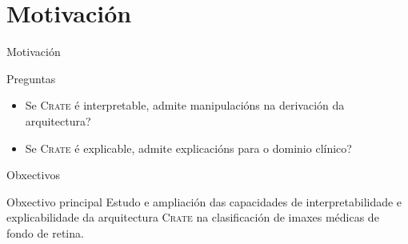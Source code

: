 \documentclass{beamer}
\begin{document}
\section{Motivación}

\begin{frame}{Motivación}
   \begin{block}{Preguntas}
    \begin{itemize}
						\item Se \textsc{Crate} é interpretable, admite manipulacións na derivación da arquitectura?
						\item Se \textsc{Crate} é explicable, admite explicacións para o dominio clínico?
    \end{itemize}
    \end{block}
\end{frame}




\begin{frame}{Obxectivos}
    \begin{block}{Obxectivo principal}
Estudo e ampliación das capacidades de interpretabilidade e explicabilidade da arquitectura \textsc{Crate} na clasificación de imaxes médicas de fondo de retina.\end{block}
\end{frame}
\end{document}
